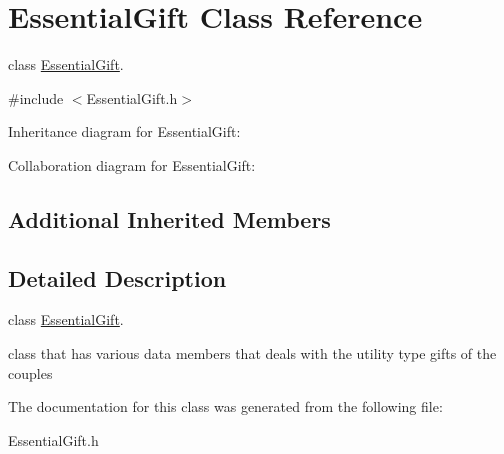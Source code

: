 \hypertarget{classEssentialGift}{}\section{Essential\+Gift Class Reference}
\label{classEssentialGift}


class \hyperlink{classEssentialGift}{Essential\+Gift}.  




{\ttfamily \#include $<$Essential\+Gift.\+h$>$}



Inheritance diagram for Essential\+Gift\+:


Collaboration diagram for Essential\+Gift\+:
\subsection*{Additional Inherited Members}


\subsection{Detailed Description}
class \hyperlink{classEssentialGift}{Essential\+Gift}. 

class that has various data members that deals with the utility type gifts of the couples 

The documentation for this class was generated from the following file\+:\begin{DoxyCompactItemize}
\item 
Essential\+Gift.\+h\end{DoxyCompactItemize}
